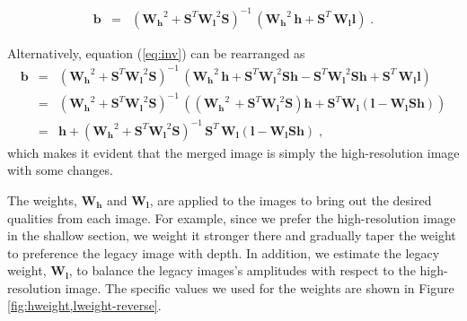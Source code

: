 \begin{eqnarray}
\mathbf{b} & = & \left(\mathbf{W_h}^2 + \mathbf{S}^T\mathbf{W_l}^2\mathbf{S}\right)^{-1}\,\left(\mathbf{W_h}^2\,\mathbf{h}+\mathbf{S}^T\,\mathbf{W_l}\mathbf{l}\right)\;.
\label{eq:inv}
\end{eqnarray}

Alternatively, equation (\ref{eq:inv}) can be rearranged as
\begin{eqnarray}
\nonumber
        \mathbf{b} & = & \left(\mathbf{W_h}^2 + \mathbf{S}^T\mathbf{W_l}^2\mathbf{S}\right)^{-1}\,\left(\mathbf{W_h}^2\,\mathbf{h}+\mathbf{S}^T\mathbf{W_l}^2\mathbf{S}\mathbf{h}-\mathbf{S}^T\mathbf{W_l}^2\mathbf{S}\mathbf{h}+\mathbf{S}^T\,\mathbf{W_l}\mathbf{l}\right) \\
\nonumber
        & = & \left(\mathbf{W_h}^2 + \mathbf{S}^T\mathbf{W_l}^2\mathbf{S}\right)^{-1}\,\left(\left(\mathbf{W_h}^2\,+\mathbf{S}^T\mathbf{W_l}^2\mathbf{S}\right)\mathbf{h} + \mathbf{S}^T\mathbf{W_l}\left(\mathbf{l}-\mathbf{W_l}\mathbf{S}\mathbf{h}\right)\right) \\
& = & \mathbf{h} +  \left(\mathbf{W_h}^2 + \mathbf{S}^T\mathbf{W_l}^2\mathbf{S}\right)^{-1}\,
\mathbf{S}^T\,\mathbf{W_l}\left(\mathbf{l - W_l S h}\right)\;,
\label{eq:inv2}
\end{eqnarray}
which makes it evident that the merged image is simply the high-resolution image with some changes.

The weights, $\mathbf{W_h}$ and $\mathbf{W_l}$, are applied to the images to bring out the desired qualities from each image.
For example, since we prefer the high-resolution image in the shallow section, we weight it stronger there and gradually taper the weight to preference the legacy image with depth.
In addition, we estimate the legacy weight, $\mathbf{W_l}$, to balance the legacy images's amplitudes with respect to the high-resolution image.
The specific values we used for the weights are shown in Figure \ref{fig:hweight,lweight-reverse}.



